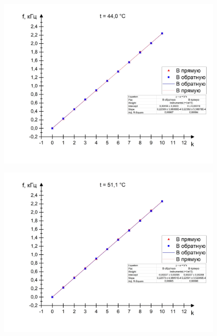 \documentclass[a4paper, 12pt]{article} %
\begin{document}
\begin{figure}
    \begin{center}
        \includegraphics[scale = 0.5]{5}
    \end{center}
\end{figure}

\begin{figure}
    \begin{center}
        \includegraphics[scale = 0.5]{6}
    \end{center}
\end{figure}
\end{document}
